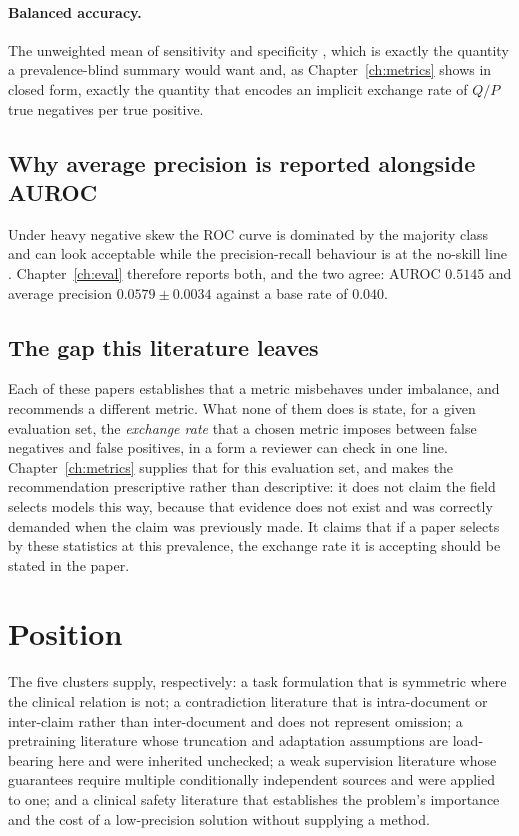 \paragraph{Balanced accuracy.} The unweighted mean of sensitivity and
specificity \citep{brodersen2010balanced}, which is exactly the quantity a
prevalence-blind summary would want and, as Chapter~\ref{ch:metrics} shows in
closed form, exactly the quantity that encodes an implicit exchange rate of
$Q/P$ true negatives per true positive.

\subsection{Why average precision is reported alongside AUROC}

Under heavy negative skew the ROC curve is dominated by the majority class and
can look acceptable while the precision-recall behaviour is at the no-skill line
\citep{saito2015prcurve}. Chapter~\ref{ch:eval} therefore reports both, and the
two agree: AUROC $0.5145$ and average precision $0.0579 \pm 0.0034$
against a base rate of $0.040$.

\subsection{The gap this literature leaves}

Each of these papers establishes that a metric misbehaves under imbalance, and
recommends a different metric. What none of them does is state, for a given
evaluation set, the \emph{exchange rate} that a chosen metric imposes between
false negatives and false positives, in a form a reviewer can check in one line.
Chapter~\ref{ch:metrics} supplies that for this evaluation set, and makes the
recommendation prescriptive rather than descriptive: it does not claim the field
selects models this way, because that evidence does not exist and was correctly
demanded when the claim was previously made. It claims that if a paper selects
by these statistics at this prevalence, the exchange rate it is accepting should
be stated in the paper.

\section{Position}
\label{sec:bg-position}

The five clusters supply, respectively: a task formulation that is symmetric
where the clinical relation is not; a contradiction literature that is
intra-document or inter-claim rather than inter-document and does not represent
omission; a pretraining literature whose truncation and adaptation assumptions
are load-bearing here and were inherited unchecked; a weak supervision
literature whose guarantees require multiple conditionally independent sources
and were applied to one; and a clinical safety literature that establishes the
problem's importance and the cost of a low-precision solution without supplying a
method.

